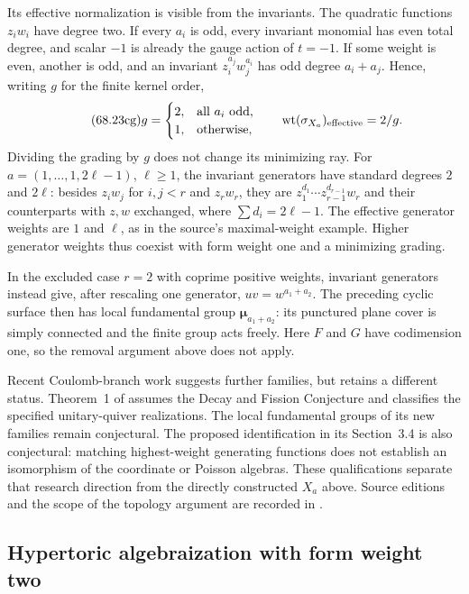 Its effective normalization is visible from the invariants.
The quadratic functions $z_iw_i$ have degree two. If every
$a_i$ is odd, every invariant monomial has even total degree,
and scalar $-1$ is already the gauge action of $t=-1$.
If some weight is even, another is odd, and an invariant
$z_i^{a_j}w_j^{a_i}$ has odd degree $a_i+a_j$.
Hence, writing $g$ for the finite kernel order,
\[
\tag{68.23cg}\label{eq:ytd-isolated-hypertoric-effective-form-weight}
 g=\begin{cases}2,&\text{all }a_i\text{ odd},\\
                 1,&\text{otherwise},\end{cases}
 \qquad \operatorname{wt}(\sigma_{X_a})_{\rm effective}=2/g.
\]
Dividing the grading by $g$ does not change its minimizing ray.
For $a=(1,\ldots,1,2\ell-1)$, $\ell\geq1$, the invariant
generators have standard degrees $2$ and $2\ell$: besides
$z_iw_j$ for $i,j<r$ and $z_rw_r$, they are
$z_1^{d_1}\cdots z_{r-1}^{d_{r-1}}w_r$ and their counterparts
with $z,w$ exchanged, where $\sum d_i=2\ell-1$.
The effective generator weights are $1$ and $\ell$, as in the
source's maximal-weight example. Higher generator weights thus
coexist with form weight one and a minimizing grading.

In the excluded case $r=2$ with coprime positive weights, invariant
generators instead give, after rescaling one generator,
$uv=w^{a_1+a_2}$. The preceding cyclic surface then has local
fundamental group $\boldsymbol\mu_{a_1+a_2}$: its punctured plane
cover is simply connected and the finite group acts freely.
Here $F$ and $G$ have codimension one, so the removal argument
above does not apply.

Recent Coulomb-branch work suggests further families, but retains
a different status. Theorem~1 of
\cite{BourgetEtAl26IsolatedCoulombV2} assumes the Decay and Fission
Conjecture and classifies the specified unitary-quiver realizations.
The local fundamental groups of its new families remain
conjectural. The proposed identification in its Section~3.4 is
also conjectural: matching highest-weight generating functions
does not establish an isomorphism of the coordinate or Poisson
algebras. These qualifications separate that research direction
from the directly constructed $X_a$ above. Source editions and
the scope of the topology argument are recorded in
.

\subsection{Hypertoric algebraization with form weight two}
\label{sec:ytd-local-hypertoric-characterization}

